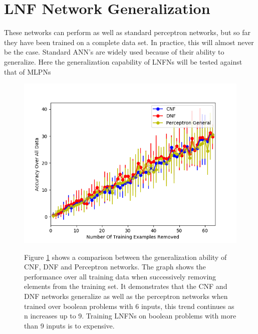 \section{LNF Network Generalization} \label{sec:lnfn-generalization}
These networks can perform as well as standard perceptron networks, but so far they have been trained on a complete data set. In practice, this will almost never be the case. Standard ANN's are widely used because of their ability to generalize. Here the generalization capability of LNFNs will be tested against that of MLPNs

\begin{figure}[H]
	\centering
	\begin{minipage}[t]{0.6\textwidth}
		\vspace{0px}
		\includegraphics[width=\textwidth]{6-generalization.png}
		\caption{}
		\label{fig:generalization-peformance-6}
	\end{minipage}
	\begin{minipage}[t]{0.39\textwidth}
	\vspace{0px}
		Figure \ref{fig:generalization-peformance-6} shows a comparison between the generalization ability of CNF, DNF and Perceptron networks. The graph shows the performance over all training data when successively removing elements from the training set. It demonstrates that the CNF and DNF networks generalize as well as the perceptron networks when trained over boolean problems with 6 inputs, this trend continues as n increases up to 9. Training LNFNs on boolean problems with more than 9 inputs is to expensive.		
	\end{minipage}
	\hfill
\end{figure}

